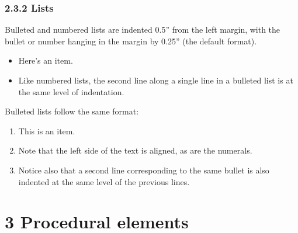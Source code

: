 {{{{\subsubsection*{2.3.2 Lists}
Bulleted and numbered lists are indented 0.5'' from the left margin, with the bullet or number hanging in the margin by 0.25'' (the default format).

\begin{itemize}
\item
  Here's an item.

\item
  Like numbered lists, the second line along a single line in a bulleted list is
  at the same level of indentation.
\end{itemize}

Bulleted lists follow the same format:
%
\begin{enumerate}
\item
  This is an item.
\item
  Note that the left side of the text is aligned, as are the numerals.
\item
  Notice also that a second line corresponding to the same bullet is also
  indented at the same level of the previous lines.
\end{enumerate}


\section*{3 Procedural elements}

}}}}
